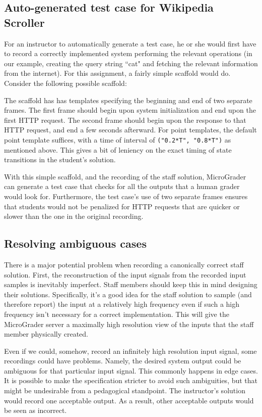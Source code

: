 \documentclass[12pt]{article}
\begin{document}
\subsection{Auto-generated test case for Wikipedia Scroller}
For an instructor to automatically generate a test case, he or she would first have to record a correctly implemented system performing the relevant operations (in our example, creating the query string ``cat" and fetching the relevant information from the internet).  For this assignment, a fairly simple scaffold would do.  Consider the following possible scaffold:

The scaffold has has templates specifying the beginning and end of two separate frames.  The first frame should begin upon system initialization and end upon the first HTTP request.  The second frame should begin upon the response to that HTTP request, and end a few seconds afterward.  For point templates, the default point template suffices, with a time of interval of \texttt{("0.2*T", "0.8*T")} as mentioned above.  This gives a bit of leniency on the exact timing of state transitions in the student's solution.

With this simple scaffold, and the recording of the staff solution, MicroGrader can generate a test case that checks for all the outputs that a human grader would look for.  Furthermore, the test case's use of two separate frames ensures that students would not be penalized for HTTP requests that are quicker or slower than the one in the original recording.

\subsection{Resolving ambiguous cases}
\label{sec:resolve-ambiguity}
There is a major potential problem when recording a canonically correct staff solution.  First, the reconstruction of the input signals from the recorded input samples is inevitably imperfect.  Staff members should keep this in mind designing their solutions.  Specifically, it's a good idea for the staff solution to sample (and therefore report) the input at a relatively high frequency even if such a high frequency isn't necessary for a correct implementation.  This will give the MicroGrader server a maximally high resolution view of the inputs that the staff member physically created.

Even if we could, somehow, record an infinitely high resolution input signal, some recordings could have problems.  Namely, the desired system output could be ambiguous for that particular input signal.  This commonly happens in edge cases.  It is possible to make the specification stricter to avoid such ambiguities, but that might be undesirable from a pedagogical standpoint.  The instructor's solution would record one acceptable output.  As a result, other acceptable outputs would be seen as incorrect.
\end{document}
